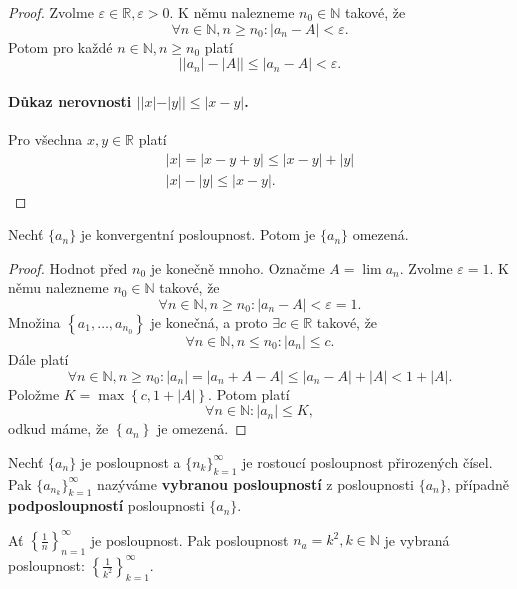 \begin{proof}
	Zvolme $\varepsilon \in \mathbb R , \varepsilon > 0$. K němu nalezneme  $n_0 \in \mathbb N $ takové, že
	$$
	    \forall n \in \mathbb N , n \geq n_0: |a_n - A| < \varepsilon.
	$$
	Potom pro každé $n \in \mathbb N , n \geq n_0$ platí
	$$
	\left | |a_n| - |A| \right | \leq |a_n - A| < \varepsilon.
	$$
	\paragraph{Důkaz nerovnosti $||x| - |y||\leq |x-y|$.} Pro všechna $x,y \in \mathbb R $ platí
	\begin{align*}
		|x| = |x-y+y| \leq |x-y| + |y| \\
		|x| - |y| \leq |x-y|.
\end{align*}
\end{proof}

\begin{veta}\label{veta2.4}
Nechť $\{a_n\}$ je konvergentní posloupnost. Potom je $\{a_n\}$ omezená.
\end{veta}

\begin{proof}
	Hodnot před $n_0$ je konečně mnoho. Označme $A = \lim a_n$. Zvolme $\varepsilon = 1$. K němu nalezneme $n_0 \in \mathbb N $
	takové, že
	$$
	    \forall n \in \mathbb N , n \geq n_0: |a_n - A| < \varepsilon = 1.
	$$
	Množina $\left \{ a_1, \dots, a_{n_0} \right \} $ je konečná, a proto $\exists c \in \mathbb R $ takové,
	že
	$$
	    \forall n \in \mathbb N , n \leq n _0: |a_n| \leq c.
	$$
	Dále platí
	$$
	    \forall n \in \mathbb N , n \geq n_0: |a_n| = |a_n +A-A| \leq |a_n - A|+ |A|< 1+|A|.
	$$
	Položme $K = \max \left \{ c, 1+|A| \right \} $. Potom platí
	$$
	    \forall n \in \mathbb N : |a_n| \leq K,
	$$
	odkud máme, že $\left \{ a_n \right \} $ je omezená.
\end{proof}

\begin{definice}
Nechť $\{a_n\}$ je posloupnost a $\{n_k\}_{k=1}^{\infty}$ je rostoucí posloupnost
přirozených čísel. Pak $\{a_{n_k}\}_{k=1}^{\infty}$ nazýváme \textbf{vybranou posloupností}
z posloupnosti $\{a_n\}$, případně \textbf{podposloupností} posloupnosti $\{a_n\}$.
\end{definice}

\begin{priklad}
	Ať $\left \{ \frac{1}{n} \right \}_{n=1}^\infty $ je posloupnost. Pak posloupnost $n_a = k^2, k \in \mathbb N $ je vybraná posloupnost:
	$\left \{ \frac{1}{k^2} \right \}_{k=1}^\infty $.
\end{priklad}

